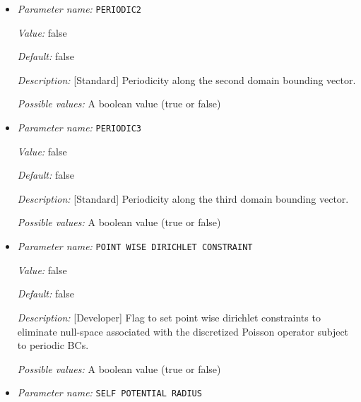 \begin{itemize}
{\it Default:} false


{\it Description:} [Standard] Periodicity along the first domain bounding vector.


{\it Possible values:} A boolean value (true or false)
\item {\it Parameter name:} {\tt PERIODIC2}
\label{parameters:Boundary conditions/PERIODIC2}
\label{parameters:Boundary_20conditions/PERIODIC2}


{\it Value:} false


{\it Default:} false


{\it Description:} [Standard] Periodicity along the second domain bounding vector.


{\it Possible values:} A boolean value (true or false)
\item {\it Parameter name:} {\tt PERIODIC3}
\label{parameters:Boundary conditions/PERIODIC3}
\label{parameters:Boundary_20conditions/PERIODIC3}


{\it Value:} false


{\it Default:} false


{\it Description:} [Standard] Periodicity along the third domain bounding vector.


{\it Possible values:} A boolean value (true or false)
\item {\it Parameter name:} {\tt POINT WISE DIRICHLET CONSTRAINT}
\label{parameters:Boundary conditions/POINT WISE DIRICHLET CONSTRAINT}
\label{parameters:Boundary_20conditions/POINT_20WISE_20DIRICHLET_20CONSTRAINT}


{\it Value:} false


{\it Default:} false


{\it Description:} [Developer] Flag to set point wise dirichlet constraints to eliminate null-space associated with the discretized Poisson operator subject to periodic BCs.


{\it Possible values:} A boolean value (true or false)
\item {\it Parameter name:} {\tt SELF POTENTIAL RADIUS}
\label{parameters:Boundary conditions/SELF POTENTIAL RADIUS}
\label{parameters:Boundary_20conditions/SELF_20POTENTIAL_20RADIUS}



\end{itemize}
